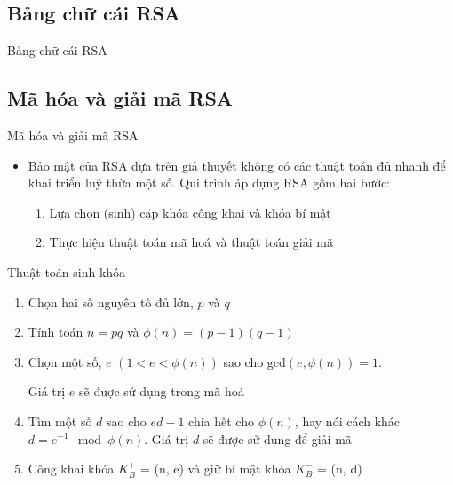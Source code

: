 \documentclass{beamer}
\numberwithin{equation}{section}
\begin{document}
\subsection{Bảng chữ cái RSA}
\begin{frame}{Bảng chữ cái RSA}

\end{frame}
\subsection{Mã hóa và giải mã RSA}
\begin{frame}{Mã hóa và giải mã RSA}
\begin{itemize}
\item Bảo mật của RSA dựa trên giả thuyết không có các thuật toán đủ nhanh để khai triển luỹ thừa một số. Qui trình áp dụng RSA gồm hai bước:
\begin{enumerate}
\item Lựa chọn (sinh) cặp khóa công khai và khóa bí mật
\item Thực hiện thuật toán mã hoá và thuật toán giải mã
\end{enumerate}
\end{itemize}
\end{frame}
\begin{frame}{Thuật toán sinh khóa}

\begin{enumerate}
\item Chọn hai số nguyên tố đủ lớn, $p$ và $q$
\item Tính toán $n = pq$ và $\phi(n) = (p - 1)(q - 1)$
\item Chọn một số, $e$ $(1 < e < \phi(n))$ sao cho $\text{gcd}(e, \phi(n)) = 1$.

Giá trị $e$ sẽ được sử dụng trong mã hoá
\item Tìm một số $d$ sao cho $ed - 1$ chia hết cho $\phi(n)$, hay nói cách khác $d = e^{-1} \mod \phi(n)$. Giá trị $d$ sẽ được sử dụng để giải mã
\item Công khai khóa $K^+_B$ = (n, e) và giữ bí mật khóa $K^-_B$ = (n, d)
\end{enumerate}

\end{frame}
\end{document}
